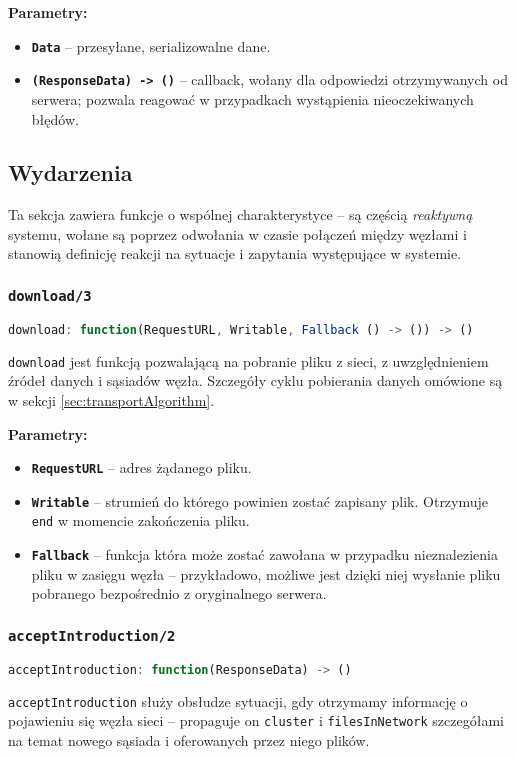 \textbf{Parametry:}
\begin{itemize}
    \item \textbf{\texttt{Data}} -- przesyłane, serializowalne dane.
    \item \textbf{\texttt{(ResponseData) -> ()}} -- callback, wołany dla odpowiedzi otrzymywanych od serwera; pozwala reagować w przypadkach wystąpienia nieoczekiwanych błędów.
\end{itemize}

% 

\subsection{Wydarzenia}
\label{sec:events}
Ta sekcja zawiera funkcje o wspólnej charakterystyce -- są częścią {\em reaktywną} systemu, wołane są poprzez odwołania w czasie połączeń między węzłami i stanowią definicję reakcji na sytuacje i zapytania występujące w systemie.

% 

\subsubsection{\texttt{download/3}}
\begin{lstlisting}[language=javascript]
     download: function(RequestURL, Writable, Fallback () -> ()) -> ()
\end{lstlisting}
\texttt{download} jest funkcją pozwalającą na pobranie pliku z sieci, z uwzględnieniem źródeł danych i sąsiadów węzła. Szczegóły cyklu pobierania danych omówione są w sekcji \ref{sec:transportAlgorithm}.

\textbf{Parametry:}
\begin{itemize}
    \item \textbf{\texttt{RequestURL}} -- adres żądanego pliku.
    \item \textbf{\texttt{Writable}} -- strumień do którego powinien zostać zapisany plik. Otrzymuje \texttt{end} w momencie zakończenia pliku.
    \item \textbf{\texttt{Fallback}} -- funkcja która może zostać zawołana w przypadku nieznalezienia pliku w zasięgu węzła -- przykładowo, możliwe jest dzięki niej wysłanie pliku pobranego bezpośrednio z oryginalnego serwera.
\end{itemize}

% 

\subsubsection{\texttt{acceptIntroduction/2}}
\begin{lstlisting}[language=javascript]
    acceptIntroduction: function(ResponseData) -> ()
\end{lstlisting}
\texttt{acceptIntroduction} służy obsłudze sytuacji, gdy otrzymamy informację o pojawieniu się węzła sieci -- propaguje on \texttt{cluster} i \texttt{filesInNetwork} szczegółami na temat nowego sąsiada i oferowanych przez niego plików. 

